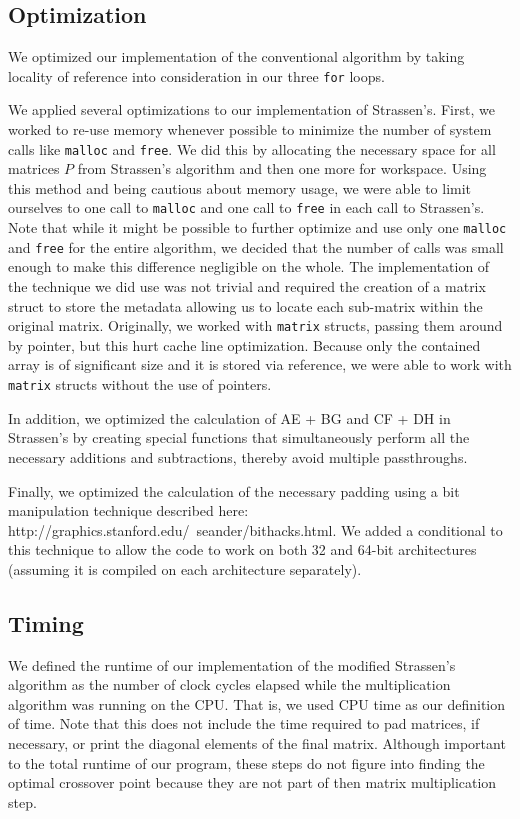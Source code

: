 \documentclass[solution, letterpaper]{cs121}
\begin{document}
\subsection*{Optimization}
\hspace{4mm} We optimized our implementation of the conventional algorithm by taking locality of reference into consideration in our three {\tt for} loops.

We applied several optimizations to our implementation of Strassen's. First, we worked to re-use memory whenever possible to minimize the number of system calls like \texttt{malloc} and \texttt{free}. We did this by allocating the necessary space for all matrices $P$ from Strassen's algorithm and then one more for workspace. Using this method and being cautious about memory usage, we were able to limit ourselves to one call to \texttt{malloc} and one call to \texttt{free} in each call to Strassen's. Note that while it might be possible to further optimize and use only one \texttt{malloc} and \texttt{free} for the entire algorithm, we decided that the number of calls was small enough to make this difference negligible on the whole. The implementation of the technique we did use was not trivial and required the creation of a matrix struct to store the metadata allowing us to locate each sub-matrix within the original matrix. Originally, we worked with \texttt{matrix} structs, passing them around by pointer, but this hurt cache line optimization. Because only the contained array is of significant size and it is stored via reference, we were able to work with \texttt{matrix} structs without the use of pointers.

In addition, we optimized the calculation of AE + BG and CF + DH in Strassen's by creating special functions that simultaneously perform all the necessary additions and subtractions, thereby avoid multiple passthroughs.

Finally, we optimized the calculation of the necessary padding using a bit manipulation technique described here: http://graphics.stanford.edu/~seander/bithacks.html. We added a conditional to this technique to allow the code to work on both 32 and 64-bit architectures (assuming it is compiled on each architecture separately).

\subsection*{Timing}
\hspace{4mm} We defined the runtime of our implementation of the modified Strassen's algorithm as the number of clock cycles elapsed while the multiplication algorithm was running on the CPU. That is, we used CPU time as our definition of time. Note that this does not include the time required to pad matrices, if necessary, or print the diagonal elements of the final matrix. Although important to the total runtime of our program, these steps do not figure into finding the optimal crossover point because they are not part of then matrix multiplication step.
\end{document}

